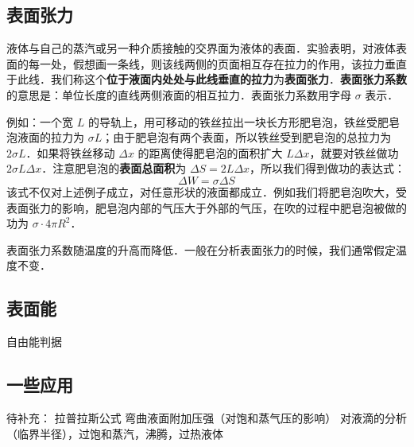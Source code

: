 
\subsection{表面张力}

液体与自己的蒸汽或另一种介质接触的交界面为液体的表面．实验表明，对液体表面的每一处，假想画一条线，则该线两侧的页面相互存在拉力的作用，该拉力垂直于此线．我们称这个\textbf{位于液面内处处与此线垂直的拉力}为\textbf{表面张力}．\textbf{表面张力系数} 的意思是：单位长度的直线两侧液面的相互拉力．表面张力系数用字母 $\sigma$ 表示．

例如：一个宽 $L$ 的导轨上，用可移动的铁丝拉出一块长方形肥皂泡，铁丝受肥皂泡液面的拉力为 $\sigma L$；由于肥皂泡有两个表面，所以铁丝受到肥皂泡的总拉力为 $2\sigma L$．如果将铁丝移动 $\Delta x$ 的距离使得肥皂泡的面积扩大 $L\Delta x$，就要对铁丝做功 $2\sigma L\Delta x$．注意肥皂泡的\textbf{表面总面积}为 $\Delta S=2 L \Delta x$，所以我们得到做功的表达式：
\begin{equation}
\Delta W=\sigma \Delta S
\end{equation}
该式不仅对上述例子成立，对任意形状的液面都成立．例如我们将肥皂泡吹大，受表面张力的影响，肥皂泡内部的气压大于外部的气压，在吹的过程中肥皂泡被做的功为 $\sigma\cdot 4\pi R^2$．

表面张力系数随温度的升高而降低．一般在分析表面张力的时候，我们通常假定温度不变．

\subsection{表面能}

自由能判据

\subsection{一些应用}
待补充：
拉普拉斯公式
弯曲液面附加压强（对饱和蒸气压的影响）
对液滴的分析（临界半径），过饱和蒸汽，沸腾，过热液体